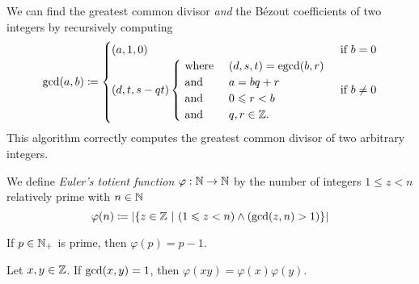 \begin{algorithm}
    We can find the greatest common divisor \emph{and} the B\'ezout coefficients
    of two integers by recursively computing
    \begin{equation*}
        \gcd\pn*{a, b} \defn 
        \begin{cases}
            (a, 1, 0)
                &\text{ if } b = 0\\
            (d, t, s - qt)
                \begin{cases}
                    \text{ where } &(d, s, t) = \text{egcd}\pn*{b, r}\\
                    \text{ and } &a = bq + r\\
                    \text{ and } &0 \leq r < b\\
                    \text{ and } &q, r \in \Z.
                \end{cases}
                &\text{ if } b \neq 0
        \end{cases}
    \end{equation*}
    This algorithm correctly computes the greatest common divisor of two arbitrary integers.
\end{algorithm}

\begin{definition}
    We define \emph{Euler's totient function} $\varphi: \mathbb{N} \to \mathbb{N}$ by the number of integers $1 \leq z < n$ relatively prime with $n \in \mathbb{N}$
    \begin{equation*}
        \varphi(n)
        \defn \cardinality*{\set*{z \in \Z \suchthat (1 \leq z < n) \meet \pn*{\gcd\pn*{z, n} > 1}}}
    \end{equation*}
\end{definition}

\begin{lemma}
    If $p \in \mathbb{N}_+$ is prime, then $\varphi(p) = p - 1$.
\end{lemma}

\begin{theorem}
    Let $x, y \in \mathbb{Z}$. If $\gcd\pn*{x, y} = 1$, then $\varphi(xy) = \varphi(x)\varphi(y)$.
\end{theorem}

